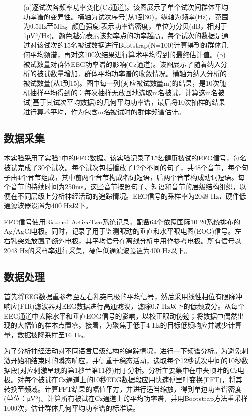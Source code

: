 \documentclass[jou,12pt,floatsintext]{apa7} %
\begin{document}
\begin{figure}[!htb]
\begin{minipage}{0.49\textwidth}
        \label{fig:fig2b}
    \end{minipage}
    \captionsetup{labelsep=period}
    \caption{\small\rm (a)逐试次各频率功率变化(Cz通道)。该图展示了单个试次间群体平均功率谱的变异性。横轴为试次序号(从1到30)，纵轴为频率(Hz)，范围为0.5Hz至5Hz。颜色强度:表示功率谱密度，单位为分贝(dB，相对于1μV²/Hz)。颜色越亮表示该频率点的功率越高。每个试次的数据是通过对该试次的15名被试数据进行Bootstrap(N=100)计算得到的群体几何平均频谱，再对这100次结果进行算术平均得到的最终估计值。(b)被试数量对群体EEG功率谱的影响(Cz通道)。该图展示了随着纳入分析的被试数量增加，群体平均功率谱的收敛情况。横轴为纳入分析的被试数量(从1到15)。图中每一列(对应被试数量m)的结果，是10次随机抽样平均得到的：每次抽样无放回地选取m名被试，计算这m名被试(基于其试次平均数据)的几何平均功率谱，最后将10次抽样的结果进行算术平均，作为包含m名被试时的群体频谱估计。}
\end{figure}
\subsection{\heiti 数据采集}

本实验采用了\textcite{jin2018eye}实验1中的EEG数据。该实验记录了15名健康被试的EEG信号，每名被试完成了30个试次。每个试次包括播放了12个不同的句子，共48个音节，每个句子由4个音节组成，其中前两个音节构成名词短语，后两个音节构成动词短语。每个音节的持续时间为250ms。这些音节按照句子、短语和音节的层级结构组织，以便在不同层级上分析神经活动的追踪情况。EEG信号的采样率为2048 Hz，硬件低通滤波器设置为400 Hz以下。

EEG信号使用Biosemi ActiveTwo系统记录，配备64个依照国际10-20系统排布的Ag/AgCl电极。同时，记录了用于监测眼动的垂直和水平眼电图(EOG)信号。左右乳突处放置了额外电极，其平均信号在离线分析中用作参考电极。所有信号以2048 Hz的采样率进行采集，硬件低通滤波设置为400 Hz以下。

\subsection{\heiti 数据处理}

首先将EEG数据重参考至左右乳突电极的平均信号，然后采用线性相位有限脉冲响应(FIR)滤波器对EEG数据进行高通滤波，滤除0.7 Hz以下的低频成分。从每个EEG通道中去除水平和垂直EOG信号的影响，以校正眼动伪迹；将数据中偶然出现的大幅值的样本点置零。接着，为聚焦于低于4 Hz的目标低频响应并减少计算量，数据被降采样至16 Hz。

为了分析神经活动对不同语言层级结构的追踪情况，进行一下频谱分析。为避免刺激开始和结束时的瞬态响应，并侧重于稳态活动，选取每个12秒试次中间的10秒数据段(对应刺激呈现的第1秒至第11秒)用于分析。分析主要集中在中央顶叶的Cz电极。对每个被试在Cz通道上的10秒EEG数据段应用快速傅里叶变换(FFT)，将其转换至频域。计算FFT结果的幅值平方，并进行适当缩放，得到单边功率谱密度(单位：μV²)。计算所有被试在Cz通道上的平均功率谱，并用Bootstrap方法重采样1000次，估计群体几何平均功率谱的标准误。
\end{document}
